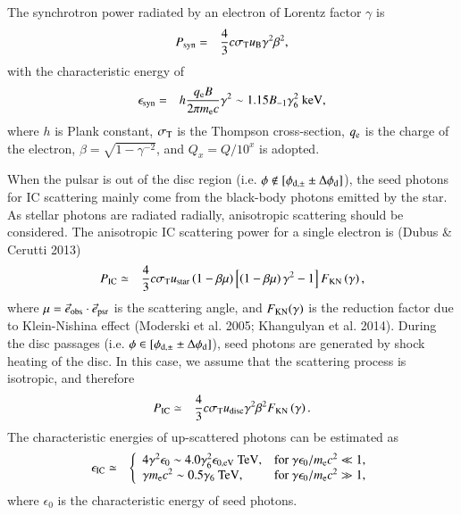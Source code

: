 \documentclass{aa}
\begin{document}
The synchrotron power radiated by an electron of Lorentz factor $\gamma$ is
\begin{eqnarray}\label{Psyn}
  P_{\rm{syn}}&=&\frac{4}{3}c\sigma _{\rm T}u_{\rm B}\gamma ^2\beta ^2,
\end{eqnarray}
with the characteristic energy of
\begin{eqnarray}\label{Esyn}
  \epsilon_{\rm{syn}}&=&h\frac{q_{\rm e}B}{2\pi m_{\rm e}c}\gamma^2\sim1.15B_{-1}\gamma_{6}^2 \ {\rm keV},
\end{eqnarray}
where $h$ is Plank constant, $\sigma_{\rm T}$ is the Thompson cross-section, $q_{\rm e}$ is the charge of the electron, $\beta=\sqrt{1-\gamma^{-2}}$, and $Q_{x}=Q/10^x$ is adopted.

When the pulsar is out of the disc region (i.e. $\phi\notin[\phi_{\rm d, \pm}\pm\Delta\phi_{\rm d}]$), the seed photons for IC scattering mainly come from the black-body photons emitted by the star. As stellar photons are radiated radially, anisotropic scattering should be considered. The anisotropic IC scattering power for a single electron is (Dubus \& Cerutti 2013)
\begin{eqnarray}\label{Pics1}
  P_{\rm{IC}}&\simeq& \frac{4}{3}c\sigma _{\rm T}u_{\rm{star}}\left( 1-\beta \mu \right) \left[ \left( 1-\beta \mu \right) \gamma ^2-1 \right]F_{\rm{KN}}\left( \gamma \right),
\end{eqnarray}
where $\mu=\vec{e}_{\rm{obs}}\cdot \vec{e}_{\rm{psr}}$ is the scattering angle, and $F_{\rm KN}(\gamma)$ is the reduction factor due to Klein-Nishina effect (Moderski et al. 2005; Khangulyan et al. 2014).
During the disc passages (i.e. $\phi\in[\phi_{\rm d, \pm}\pm\Delta\phi_{\rm d}]$), seed photons are generated by shock heating of the disc. In this case, we assume that the scattering process is isotropic, and therefore
\begin{eqnarray}\label{Pics2}
  P_{\rm{IC}}&\simeq& \frac{4}{3}c\sigma _{\rm T}u_{\rm{disc}}\gamma ^2\beta ^2F_{\rm{KN}}\left(\gamma \right).
\end{eqnarray}
The characteristic energies of up-scattered photons can be estimated as
\begin{eqnarray}\label{Eics}
  \epsilon_{\rm IC}&\simeq&
  \left\{
    \begin{array}{ll}
      4\gamma ^2\epsilon _0\sim4.0\gamma_{6}^2\epsilon _{0,\rm eV}\ {\rm TeV}, & \hbox{for $\gamma \epsilon _0/m_{\rm{e}}c^2\ll 1$,} \\
      \gamma m_{\rm{e}}c^2\sim0.5\gamma_{6}\ {\rm TeV}, & \hbox{for $\gamma \epsilon _0/m_{\rm{e}}c^2\gg 1$,}
    \end{array}
  \right.
\end{eqnarray}
where $\epsilon_0$ is the characteristic energy of seed photons.
\end{document}

